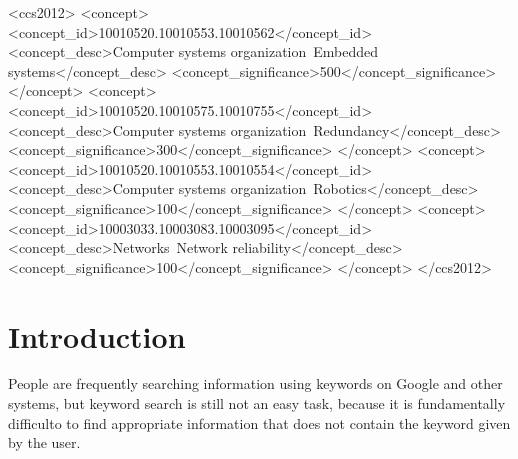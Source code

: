 \documentclass[manuscript,screen,review]{acmart}
\begin{document}
\begin{CCSXML}
<ccs2012>
 <concept>
  <concept_id>10010520.10010553.10010562</concept_id>
  <concept_desc>Computer systems organization~Embedded systems</concept_desc>
  <concept_significance>500</concept_significance>
 </concept>
 <concept>
  <concept_id>10010520.10010575.10010755</concept_id>
  <concept_desc>Computer systems organization~Redundancy</concept_desc>
  <concept_significance>300</concept_significance>
 </concept>
 <concept>
  <concept_id>10010520.10010553.10010554</concept_id>
  <concept_desc>Computer systems organization~Robotics</concept_desc>
  <concept_significance>100</concept_significance>
 </concept>
 <concept>
  <concept_id>10003033.10003083.10003095</concept_id>
  <concept_desc>Networks~Network reliability</concept_desc>
  <concept_significance>100</concept_significance>
 </concept>
</ccs2012>
\end{CCSXML}




\maketitle

\section{Introduction}

People are frequently searching information using keywords on Google
and other systems, but keyword search is still not an easy task,
because it is fundamentally difficulto to find appropriate information
that does not contain the keyword given by the user.

\end{document}

